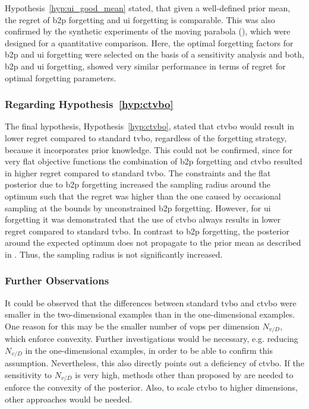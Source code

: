 Hypothesis~\ref{hyp:ui_good_mean} stated, that given a well-defined prior mean, the regret of \gls{b2p} forgetting and \gls{ui} forgetting is comparable. This was also confirmed by the synthetic experiments of the moving parabola (), which were designed for a quantitative comparison. Here, the optimal forgetting factors for \gls{b2p} and \gls{ui} forgetting were selected on the basis of a sensitivity analysis and both, \gls{b2p} and \gls{ui} forgetting, showed very similar performance in terms of regret for optimal forgetting parameters.

\subsubsection{Regarding Hypothesis~\ref{hyp:ctvbo}}

The final hypothesis, Hypothesis~\ref{hyp:ctvbo}, stated that \gls{ctvbo} would result in lower regret compared to standard \gls{tvbo}, regardless of the forgetting strategy, because it incorporates prior knowledge. This could not be confirmed, since for very flat objective functions the combination of \gls{b2p} forgetting and \gls{ctvbo} resulted in higher regret compared to standard \gls{tvbo}. The constraints and the flat posterior due to \gls{b2p} forgetting increased the sampling radius around the optimum such that the regret was higher than the one caused by occasional sampling at the bounds by unconstrained \gls{b2p} forgetting. However, for \gls{ui} forgetting it was demonstrated that the use of \gls{ctvbo} always results in lower regret compared to standard \gls{tvbo}. In contrast to \gls{b2p} forgetting, the posterior around the expected optimum does not propagate to the prior mean as described in . Thus, the sampling radius is not significantly increased. 

\subsubsection{Further Observations}

It could be observed that the differences between standard \gls{tvbo} and \gls{ctvbo} were smaller in the two-dimensional examples than in the one-dimensional examples. One reason for this may be the smaller number of \glspl{vop} per dimension $N_{v/D}$, which enforce convexity. Further investigations would be necessary, e.g. reducing $N_{v/D}$ in the one-dimensional examples, in order to be able to confirm this assumption. Nevertheless, this also directly points out a deficiency of \gls{ctvbo}. If the sensitivity to $N_{v/D}$ is very high, methods other than proposed by \textcite{Agrell_2019} are needed to enforce the convexity of the posterior. Also, to scale \gls{ctvbo} to higher dimensions, other approaches would be needed.

